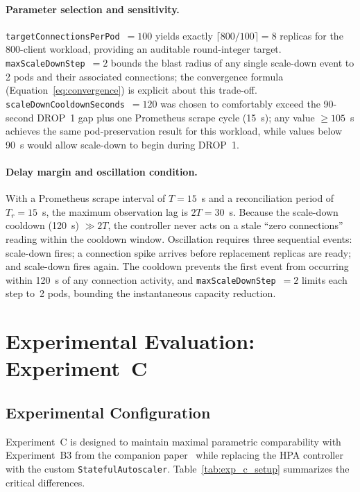 \documentclass[twocolumn]{svjour3}
\begin{document}
\paragraph{Parameter selection and sensitivity.}
\texttt{targetConnectionsPerPod}~$= 100$ yields exactly $\lceil800/100\rceil = 8$ replicas for
the 800-client workload, providing an auditable round-integer target.
\texttt{maxScaleDownStep}~$= 2$ bounds the blast radius of any single scale-down event to 2
pods and their associated connections; the convergence formula (Equation~\ref{eq:convergence})
is explicit about this trade-off. \texttt{scaleDownCooldownSeconds}~$= 120$ was chosen to
comfortably exceed the 90-second DROP~1 gap plus one Prometheus scrape cycle (15~s); any
value $\geq 105$~s achieves the same pod-preservation result for this workload, while values
below 90~s would allow scale-down to begin during DROP~1.

\paragraph{Delay margin and oscillation condition.}
With a Prometheus scrape interval of $T = 15$~s and a reconciliation period of $T_r = 15$~s,
the maximum observation lag is $2T = 30$~s. Because the scale-down cooldown (120~s)
$\gg 2T$, the controller never acts on a stale ``zero connections'' reading within the cooldown
window. Oscillation requires three sequential events: scale-down fires; a connection spike
arrives before replacement replicas are ready; and scale-down fires again. The cooldown
prevents the first event from occurring within 120~s of any connection activity, and
\texttt{maxScaleDownStep}~$= 2$ limits each step to~2 pods, bounding the instantaneous
capacity reduction.



\section{Experimental Evaluation: Experiment~C}
\label{sec:evaluation}

\subsection{Experimental Configuration}

Experiment~C is designed to maintain maximal parametric comparability with Experiment~B3
from the companion paper~\cite{behera2026hpa} while replacing the HPA controller with the
custom \texttt{StatefulAutoscaler}. Table~\ref{tab:exp_c_setup} summarizes the critical
differences.
\end{document}
